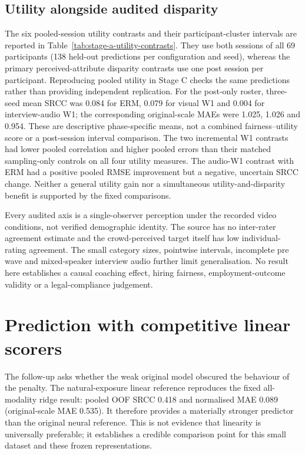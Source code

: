 \subsection{Utility alongside audited disparity}

The six pooled-session utility contrasts and their participant-cluster intervals are reported in
Table~\ref{tab:stage-a-utility-contrasts}. They use both sessions of all 69 participants (138
held-out predictions per configuration and seed), whereas the primary perceived-attribute
disparity contrasts use one post session per participant. Reproducing pooled utility in Stage C
checks the same predictions rather than providing independent replication. For the post-only
roster, three-seed mean SRCC was 0.084 for ERM, 0.079 for visual W1 and 0.004 for
interview-audio W1; the corresponding original-scale MAEs were 1.025, 1.026 and 0.954.
These are descriptive phase-specific means, not a combined fairness--utility score or a
post-session interval comparison. The two incremental W1 contrasts had lower pooled correlation
and higher pooled errors than their matched sampling-only controls on all four utility measures.
The audio-W1 contrast with ERM had a positive pooled RMSE improvement but a negative, uncertain
SRCC change. Neither a general utility gain nor a simultaneous utility-and-disparity benefit is
supported by the fixed comparisons.

Every audited axis is a single-observer perception under the recorded video conditions, not
verified demographic identity. The source has no inter-rater agreement estimate and the
crowd-perceived target itself has low individual-rating agreement. The small category sizes,
pointwise intervals, incomplete pre wave and mixed-speaker interview audio further limit
generalisation. No result here establishes a causal coaching effect, hiring fairness,
employment-outcome validity or a legal-compliance judgement.

\section{Prediction with competitive linear scorers}
\label{sec:linear-results}

The follow-up asks whether the weak original model obscured the behaviour of the penalty.
The natural-exposure linear reference reproduces the fixed all-modality ridge result:
pooled OOF SRCC 0.418 and normalised MAE 0.089 (original-scale MAE 0.535). It therefore
provides a materially stronger predictor than the original neural reference. This is not
evidence that linearity is universally preferable; it establishes a credible comparison
point for this small dataset and these frozen representations.

